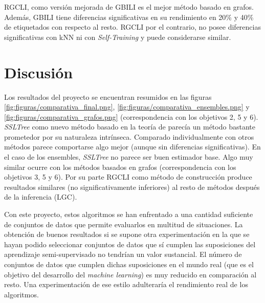 



RGCLI, como versión mejorada de GBILI es el mejor método basado en grafos. Además, GBILI tiene diferencias significativas en su rendimiento en 20\% y 40\% de etiquetados con respecto al resto. RGCLI por el contrario, no posee diferencias significativas con kNN ni con \textit{Self-Training} y puede considerarse similar. 

\section{Discusión}

Los resultados del proyecto se encuentran resumidos en las figuras \ref{fig:figuras/comparativa_final.png}, \ref{fig:figuras/comparativa_ensembles.png}  y \ref{fig:figuras/comparativa_grafos.png} (correspondencia con los objetivos 2, 5 y 6). \textit{SSLTree} como nuevo método basado en la teoría de \cite{levatic2017semi} parecía un método bastante prometedor por su naturaleza intrínseca. Comparado individualmente con otros métodos parece comportarse algo mejor (aunque sin diferencias significativas). En el caso de los ensembles, \textit{SSLTree} no parece ser buen estimador base. Algo muy similar ocurre con los métodos basados en grafos (correspondencia con los objetivos 3, 5 y 6). Por su parte RGCLI como método de construcción produce resultados similares (no significativamente inferiores) al resto de métodos después de la inferencia (LGC).

Con este proyecto, estos algoritmos se han enfrentado a una cantidad suficiente de conjuntos de datos que permite evaluarlos en multitud de situaciones. La obtención de buenos resultados si se supone otra experimentación en la que se hayan podido seleccionar conjuntos de datos que sí cumplen las suposiciones del aprendizaje semi-supervisado no tendrían un valor sustancial. El número de conjuntos de datos que cumplen dichas suposiciones en el mundo real (que es el objetivo del desarrollo del \textit{machine learning}) es muy reducido en comparación al resto. Una experimentación de ese estilo adulteraría el rendimiento real de los algoritmos.


